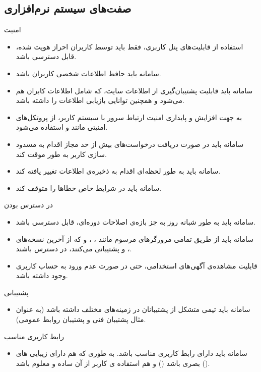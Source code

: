 \documentclass[12pt,svgnames,oneside]{book}
\newcounter{itemadded}
\let\LaTeXStandardEnumerateBegin\enumerate
\let\LaTeXStandardEnumerateEnd\endenumerate
\renewenvironment{enumerate}{%
	\LaTeXStandardEnumerateBegin%
	\setcounter{itemadded}{0}
}{%
	\LaTeXStandardEnumerateEnd%
}%
\begin{document}
			\subsection{صفت‌های سیستم‌ نرم‌افزاری}
				\begin{enumerate}
					\item امنیت
						\begin{itemize}
							\item
							استفاده از قابلیت‌های پنل کاربری، فقط باید توسط کاربران احراز هویت شده، قابل دسترسی باشد.
							\item
							سامانه باید حافظ اطلاعات شخصی کاربران باشد.
							\item
							سامانه باید قابلیت پشتیبان‌گیری از اطلاعات سایت، که شامل اطلاعات کابران هم می‌شود و همچنین توانایی بازیابی اطلاعات را داشته باشد.
							\item
							به جهت افزایش و پایداری امنیت ارتباط سرور با سیستم کاربر، از پروتکل‌های امنیتی مانند  و  استفاده می‌شود.
							\item
							سامانه باید در صورت دریافت درخواست‌های بیش از حد مجاز اقدام به مسدود سازی کاربر به طور موقت کند.
							\item
							سامانه باید به طور لحظه‌ای اقدام به ذخیره‌ی اطلاعات تغییر یافته کند.
							\item
							سامانه باید در شرایط خاص خطاها را متوقف کند.
						\end{itemize}

					\item در دسترس بودن
						\begin{itemize}
							\item
							سامانه باید به طور شبانه روز به جز بازه‌ی اصلاحات دوره‌ای، قابل دسترسی باشد.
							\item
							سامانه باید از طریق تمامی مرورگر‌های مرسوم مانند
							،
							،
							و
							که از آخرین نسخه‌های
							،
							و
							پشتیبانی می‌کنند، در دسترس باشند.
							\item
							قابلیت مشاهده‌ی آگهی‌های استخدامی، حتی در صورت عدم ورود به حساب کاربری وجود داشته باشد.
						\end{itemize}

					\item پشتیبانی
						\begin{itemize}
							\item
							سامانه باید تیمی متشکل از پشتیبانان در زمینه‌های مختلف داشته باشد (به عنوان مثال پشتیبان فنی و پشتیبان روابط عمومی).
						\end{itemize}

					\item رابط کاربری مناسب
						\begin{itemize}
							\item
							سامانه باید دارای رابط کاربری مناسب باشد. به طوری که هم دارای زیبایی های بصری باشد () و هم استفاده ی کاربر از آن ساده و معلوم باشد ().
						\end{itemize}
				\end{enumerate}
\end{document}
